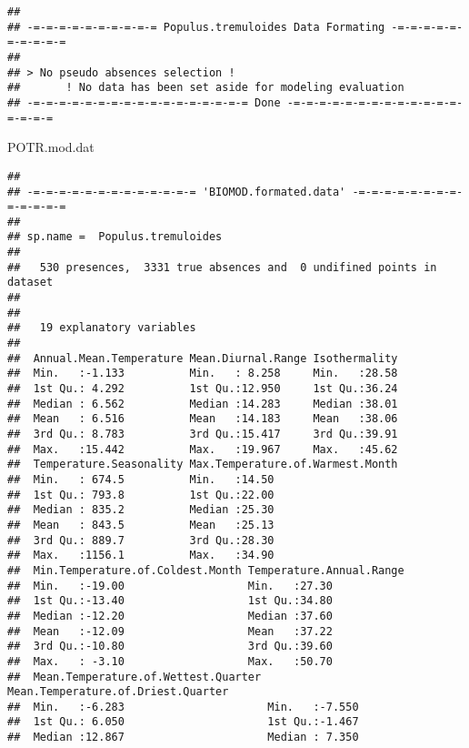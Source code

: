 \documentclass[]{article}
\newenvironment{Shaded}{\begin{snugshade}}{\end{snugshade}}
\newcommand{\NormalTok}[1]{#1}
\begin{document}
\begin{verbatim}
## 
## -=-=-=-=-=-=-=-=-=-= Populus.tremuloides Data Formating -=-=-=-=-=-=-=-=-=-=
## 
## > No pseudo absences selection !
##       ! No data has been set aside for modeling evaluation
## -=-=-=-=-=-=-=-=-=-=-=-=-=-=-=-=-= Done -=-=-=-=-=-=-=-=-=-=-=-=-=-=-=-=-=
\end{verbatim}

\begin{Shaded}
\begin{Highlighting}[]
\NormalTok{POTR.mod.dat}
\end{Highlighting}
\end{Shaded}

\begin{verbatim}
## 
## -=-=-=-=-=-=-=-=-=-=-=-=-= 'BIOMOD.formated.data' -=-=-=-=-=-=-=-=-=-=-=-=-=
## 
## sp.name =  Populus.tremuloides
## 
##   530 presences,  3331 true absences and  0 undifined points in dataset
## 
## 
##   19 explanatory variables
## 
##  Annual.Mean.Temperature Mean.Diurnal.Range Isothermality  
##  Min.   :-1.133          Min.   : 8.258     Min.   :28.58  
##  1st Qu.: 4.292          1st Qu.:12.950     1st Qu.:36.24  
##  Median : 6.562          Median :14.283     Median :38.01  
##  Mean   : 6.516          Mean   :14.183     Mean   :38.06  
##  3rd Qu.: 8.783          3rd Qu.:15.417     3rd Qu.:39.91  
##  Max.   :15.442          Max.   :19.967     Max.   :45.62  
##  Temperature.Seasonality Max.Temperature.of.Warmest.Month
##  Min.   : 674.5          Min.   :14.50                   
##  1st Qu.: 793.8          1st Qu.:22.00                   
##  Median : 835.2          Median :25.30                   
##  Mean   : 843.5          Mean   :25.13                   
##  3rd Qu.: 889.7          3rd Qu.:28.30                   
##  Max.   :1156.1          Max.   :34.90                   
##  Min.Temperature.of.Coldest.Month Temperature.Annual.Range
##  Min.   :-19.00                   Min.   :27.30           
##  1st Qu.:-13.40                   1st Qu.:34.80           
##  Median :-12.20                   Median :37.60           
##  Mean   :-12.09                   Mean   :37.22           
##  3rd Qu.:-10.80                   3rd Qu.:39.60           
##  Max.   : -3.10                   Max.   :50.70           
##  Mean.Temperature.of.Wettest.Quarter Mean.Temperature.of.Driest.Quarter
##  Min.   :-6.283                      Min.   :-7.550                    
##  1st Qu.: 6.050                      1st Qu.:-1.467                    
##  Median :12.867                      Median : 7.350                    

\end{verbatim}
\end{document}
